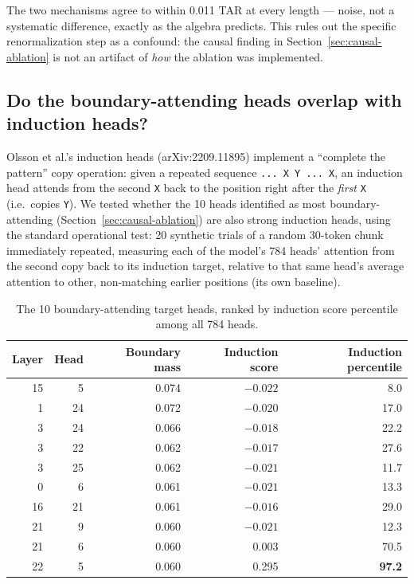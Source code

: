 \documentclass[11pt]{article}
\begin{document}
The two mechanisms agree to within 0.011 TAR at every length --- noise, not a systematic difference, exactly as the algebra predicts. This rules out the specific renormalization step as a confound: the causal finding in Section~\ref{sec:causal-ablation} is not an artifact of \emph{how} the ablation was implemented.

\subsection{Do the boundary-attending heads overlap with induction heads?}
\label{sec:induction-heads}

Olsson et al.'s induction heads (arXiv:2209.11895) implement a ``complete the pattern'' copy operation: given a repeated sequence \texttt{... X Y ... X}, an induction head attends from the second \texttt{X} back to the position right after the \emph{first} \texttt{X} (i.e.\ copies \texttt{Y}). We tested whether the 10 heads identified as most boundary-attending (Section~\ref{sec:causal-ablation}) are also strong induction heads, using the standard operational test: 20 synthetic trials of a random 30-token chunk immediately repeated, measuring each of the model's 784 heads' attention from the second copy back to its induction target, relative to that same head's average attention to other, non-matching earlier positions (its own baseline).

\begin{table}[htbp]
\centering
\small
\begin{tabular}{rrrrr}
\toprule
Layer & Head & Boundary mass & Induction score & Induction percentile \\
\midrule
15 & 5  & 0.074 & $-0.022$ & 8.0 \\
1  & 24 & 0.072 & $-0.020$ & 17.0 \\
3  & 24 & 0.066 & $-0.018$ & 22.2 \\
3  & 22 & 0.062 & $-0.017$ & 27.6 \\
3  & 25 & 0.062 & $-0.021$ & 11.7 \\
0  & 6  & 0.061 & $-0.021$ & 13.3 \\
16 & 21 & 0.061 & $-0.016$ & 29.0 \\
21 & 9  & 0.060 & $-0.021$ & 12.3 \\
21 & 6  & 0.060 & 0.003 & 70.5 \\
22 & 5  & 0.060 & 0.295 & \textbf{97.2} \\
\bottomrule
\end{tabular}
\caption{The 10 boundary-attending target heads, ranked by induction score percentile among all 784 heads.}
\end{table}
\end{document}
